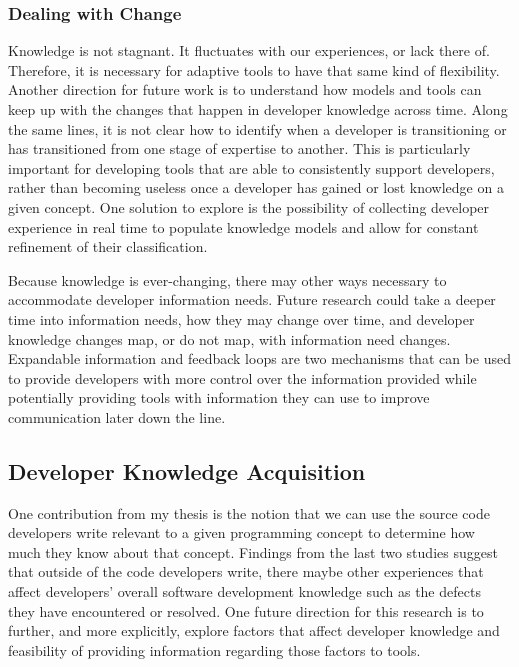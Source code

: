 \subsubsection{Dealing with Change}
Knowledge is not stagnant. It fluctuates with our experiences, or lack there of. 
Therefore, it is necessary for adaptive tools to have that same kind of flexibility. 
Another direction for future work is to understand how models and tools can keep up with the changes that happen in developer knowledge across time. 
Along the same lines, it is not clear how to identify when a developer is transitioning or has transitioned from one stage of expertise to another.
This is particularly important for developing tools that are able to consistently support developers, rather than becoming useless once a developer has gained or lost knowledge on a given concept.
One solution to explore is the possibility of collecting developer experience in real time to populate knowledge models and allow for constant refinement of their classification.

Because knowledge is ever-changing, there may other ways necessary to accommodate developer information needs. 
Future research could take a deeper time into information needs, how they may change over time, and developer knowledge changes map, or do not map, with information need changes. Expandable information and feedback loops are two mechanisms that can be used to provide developers with more control over the information provided while potentially providing tools with information they can use to improve communication later down the line.


\subsection{Developer Knowledge Acquisition}

One contribution from my thesis is the notion that we can use the source code developers write relevant to a given programming concept to determine how much they know about that concept. 
Findings from the last two studies suggest that outside of the code developers write, there maybe other experiences that affect developers' overall software development knowledge such as the defects they have encountered or resolved. One future direction for this research is to further, and more explicitly, explore factors that affect developer knowledge and feasibility of providing information regarding those factors to tools.

